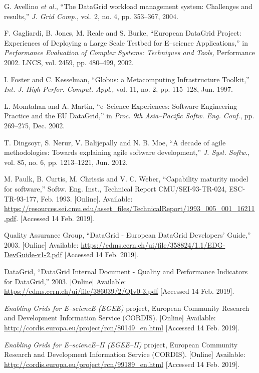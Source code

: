 \begin{thebibliography}{1}
G. Avellino \emph{et al.},
``The DataGrid workload management system: Challenges and results,''
\emph{J. Grid Comp.},
vol. 2, no. 4, pp. 353--367, 2004.


F. Gagliardi, B. Jones, M. Reale and S. Burke,
``European DataGrid Project: Experiences of Deploying a Large Scale Testbed for E--science Applications,''
in \emph{Performance Evaluation of Complex Systems: Techniques and Tools,}
Performance 2002. LNCS, vol. 2459, pp. 480--499, 2002.

I. Foster and C. Kesselman,
``Globus: a Metacomputing Infrastructure Toolkit,''
\emph{Int. J. High Perfor. Comput. Appl.,}
vol. 11, no. 2, pp. 115--128, Jun. 1997.

L. Momtahan and A. Martin,
``e--Science Experiences: Software Engineering Practice and the EU DataGrid,''
in \emph{Proc. 9th Asia--Pacific Softw. Eng. Conf.},
pp. 269--275, Dec. 2002.

T. Dingsoyr, S. Nerur, V. Balijepally and N. B. Moe,
``A decade of agile methodologies: Towards explaining agile software development,''
\emph{J. Syst. Softw.},
vol. 85, no. 6, pp. 1213--1221, Jun. 2012.


M. Paulk, B. Curtis, M. Chrissis and V. C. Weber,
``Capability maturity model for software,''
Softw. Eng. Inst.,
Technical Report CMU/SEI-93-TR-024, ESC-TR-93-177, Feb. 1993.
[Online]. Available: \url{https://resources.sei.cmu.edu/asset_files/TechnicalReport/1993_005_001_16211.pdf}.
[Accessed 14 Feb. 2019].

Quality Assurance Group, ``DataGrid - European DataGrid Developers' Guide,''
2003.
[Online] Available: \url{https://edms.cern.ch/ui/file/358824/1.1/EDG-DevGuide-v1-2.pdf}
[Accessed 14 Feb. 2019].

DataGrid, ``DataGrid Internal Document - Quality and Performance Indicators for DataGrid,''
2003.
[Online] Available: \url{https://edms.cern.ch/ui/file/386039/2/QIv0-3.pdf}
[Accessed 14 Feb. 2019].

\emph{Enabling Grids for E--sciencE (EGEE)} project, European Community Research and
Development Information Service (CORDIS).
[Online] Available: \url{http://cordis.europa.eu/project/rcn/80149_en.html}
[Accessed 14 Feb. 2019].

\emph{Enabling Grids for E--sciencE--II (EGEE--II)} project, European Community Research and
Development Information Service (CORDIS).
[Online] Available: \url{http://cordis.europa.eu/project/rcn/99189_en.html}
[Accessed 14 Feb. 2019].


\end{thebibliography}
